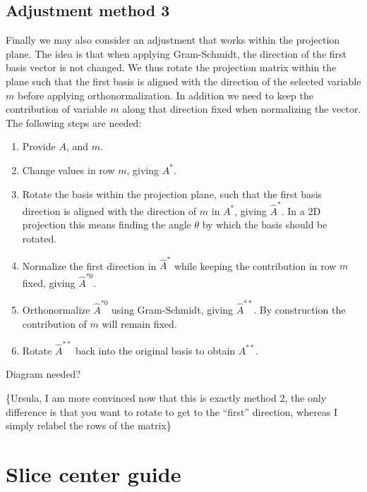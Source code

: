 \documentclass[]{interact}
\theoremstyle{plain}%
\theoremstyle{definition}
\theoremstyle{remark}
\providecommand{\tightlist}{%
  \setlength{\itemsep}{0pt}\setlength{\parskip}{0pt}}
\def\tightlist{}
\begin{document}
\hypertarget{adjustment-method-3}{%
\subsection{Adjustment method 3}\label{adjustment-method-3}}

Finally we may also consider an adjustment that works within the
projection plane. The idea is that when applying Gram-Schmidt, the
direction of the first basis vector is not changed. We thus rotate the
projection matrix within the plane such that the first basis is aligned
with the direction of the selected variable \(m\) before applying
orthonormalization. In addition we need to keep the contribution of
variable \(m\) along that direction fixed when normalizing the vector.
The following steps are needed:

\begin{enumerate}
\def\labelenumi{\arabic{enumi}.}
\tightlist
\item
  Provide \(A\), and \(m\).
\item
  Change values in row \(m\), giving \(A^*\).
\item
  Rotate the basis within the projection plane, such that the first
  basis direction is aligned with the direction of \(m\) in \(A^*\),
  giving \(\hat A^*\). In a 2D projection this means finding the angle
  \(\theta\) by which the basis should be rotated.
\item
  Normalize the first direction in \(\hat A^*\) while keeping the
  contribution in row \(m\) fixed, giving \(\hat A^{*0}\).
\item
  Orthonormalize \(\hat A^{*0}\) using Gram-Schmidt, giving
  \(\hat A^{**}\). By construction the contribution of \(m\) will remain
  fixed.
\item
  Rotate \(\hat A^{**}\) back into the original basis to obtain
  \(A^{**}\).
\end{enumerate}

Diagram needed?

\{\textcolor{blue} Ursula, I am more convinced now that this is exactly
method 2, the only difference is that you want to rotate to get to the
``first'' direction, whereas I simply relabel the rows of the matrix\}

\hypertarget{slice-center-guide}{%
\section{Slice center guide}\label{slice-center-guide}}
\end{document}
